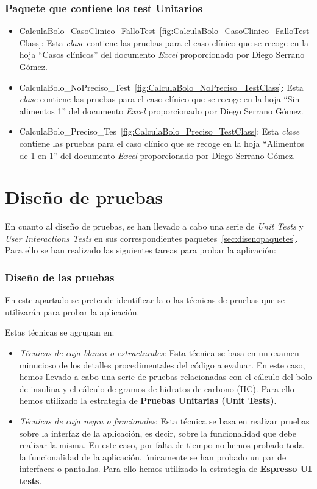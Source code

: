 \subsubsection{Paquete que contiene los test Unitarios}
\begin{itemize}
	\item CalculaBolo\_CasoClinico\_FalloTest~\ref{fig:CalculaBolo_CasoClinico_FalloTestClass}: Esta \textit{clase} contiene las pruebas para el caso clínico que se recoge en la hoja ``Casos clínicos'' del documento \textit{Excel} proporcionado por Diego Serrano Gómez.
	\item CalculaBolo\_NoPreciso\_Test~\ref{fig:CalculaBolo_NoPreciso_TestClass}: Esta \textit{clase} contiene las pruebas para el caso clínico que se recoge en la hoja ``Sin alimentos 1'' del documento \textit{Excel} proporcionado por Diego Serrano Gómez.
	\item CalculaBolo\_Preciso\_Tes~\ref{fig:CalculaBolo_Preciso_TestClass}: Esta \textit{clase} contiene las pruebas para el caso clínico que se recoge en la hoja ``Alimentos de 1 en 1'' del documento \textit{Excel} proporcionado por Diego Serrano Gómez.
\end{itemize}
\section{Diseño de pruebas}
En cuanto al diseño de pruebas, se han llevado a cabo una serie de \textit{Unit Tests} y \textit{User Interactions Tests} en sus correspondientes paquetes~\ref{sec:disenopaquetes}.
Para ello se han realizado las siguientes tareas para probar la aplicación:
\subsubsection{Diseño de las pruebas}
En este apartado se pretende identificar la o las técnicas de pruebas que se utilizarán para probar la aplicación.

Estas técnicas se agrupan en:
\begin{itemize}
	\item \textit{Técnicas de caja blanca o estructurales}: Esta técnica se basa en un examen minucioso de los detalles procedimentales del código a evaluar. En este caso, hemos llevado a cabo una serie de pruebas relacionadas con el cálculo del bolo de insulina y el cálculo de gramos de hidratos de carbono (HC). Para ello hemos utilizado la estrategia de \textbf{Pruebas Unitarias (Unit Tests)}.
	\item \textit{Técnicas de caja negra o funcionales}: Esta técnica se basa en realizar pruebas sobre la interfaz de la aplicación, es decir, sobre la funcionalidad que debe realizar la misma. En este caso, por falta de tiempo no hemos probado toda la funcionalidad de la aplicación, únicamente se han probado un par de interfaces o pantallas. Para ello hemos utilizado la estrategia de \textbf{Espresso UI tests}.
\end{itemize}
